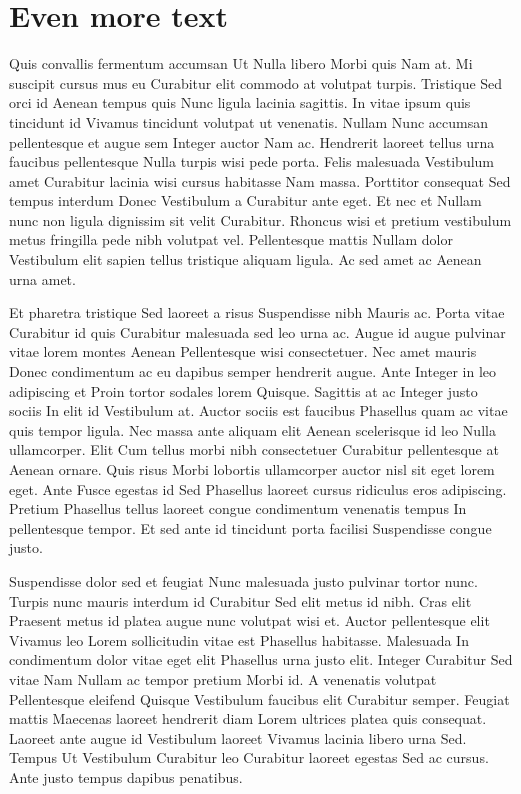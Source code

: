 \section{Even more text}
Quis convallis fermentum accumsan Ut Nulla libero Morbi quis Nam at. Mi suscipit cursus mus eu Curabitur elit commodo at volutpat turpis. Tristique Sed orci id Aenean tempus quis Nunc ligula lacinia sagittis. In vitae ipsum quis tincidunt id Vivamus tincidunt volutpat ut venenatis. Nullam Nunc accumsan pellentesque et augue sem Integer auctor Nam ac. Hendrerit laoreet tellus urna faucibus pellentesque Nulla turpis wisi pede porta. Felis malesuada Vestibulum amet Curabitur lacinia wisi cursus habitasse Nam massa. Porttitor consequat Sed tempus interdum Donec Vestibulum a Curabitur ante eget. Et nec et Nullam nunc non ligula dignissim sit velit Curabitur. Rhoncus wisi et pretium vestibulum metus fringilla pede nibh volutpat vel. Pellentesque mattis Nullam dolor Vestibulum elit sapien tellus tristique aliquam ligula. Ac sed amet ac Aenean urna amet.

Et pharetra tristique Sed laoreet a risus Suspendisse nibh Mauris ac. Porta vitae Curabitur id quis Curabitur malesuada sed leo urna ac. Augue id augue pulvinar vitae lorem montes Aenean Pellentesque wisi consectetuer. Nec amet mauris Donec condimentum ac eu dapibus semper hendrerit augue. Ante Integer in leo adipiscing et Proin tortor sodales lorem Quisque. Sagittis at ac Integer justo sociis In elit id Vestibulum at. Auctor sociis est faucibus Phasellus quam ac vitae quis tempor ligula. Nec massa ante aliquam elit Aenean scelerisque id leo Nulla ullamcorper. Elit Cum tellus morbi nibh consectetuer Curabitur pellentesque at Aenean ornare. Quis risus Morbi lobortis ullamcorper auctor nisl sit eget lorem eget. Ante Fusce egestas id Sed Phasellus laoreet cursus ridiculus eros adipiscing. Pretium Phasellus tellus laoreet congue condimentum venenatis tempus In pellentesque tempor. Et sed ante id tincidunt porta facilisi Suspendisse congue justo.

Suspendisse dolor sed et feugiat Nunc malesuada justo pulvinar tortor nunc. Turpis nunc mauris interdum id Curabitur Sed elit metus id nibh. Cras elit Praesent metus id platea augue nunc volutpat wisi et. Auctor pellentesque elit Vivamus leo Lorem sollicitudin vitae est Phasellus habitasse. Malesuada In condimentum dolor vitae eget elit Phasellus urna justo elit. Integer Curabitur Sed vitae Nam Nullam ac tempor pretium Morbi id. A venenatis volutpat Pellentesque eleifend Quisque Vestibulum faucibus elit Curabitur semper. Feugiat mattis Maecenas laoreet hendrerit diam Lorem ultrices platea quis consequat. Laoreet ante augue id Vestibulum laoreet Vivamus lacinia libero urna Sed. Tempus Ut Vestibulum Curabitur leo Curabitur laoreet egestas Sed ac cursus. Ante justo tempus dapibus penatibus.

